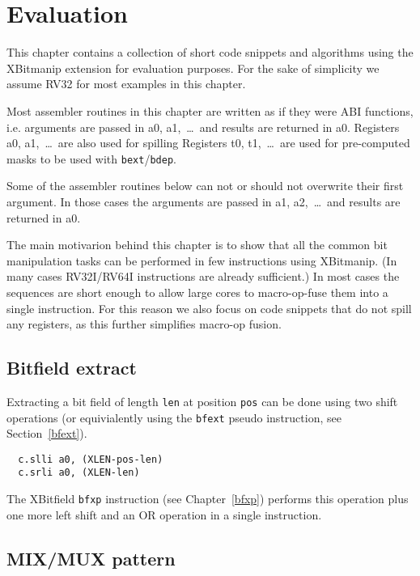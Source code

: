\chapter{Evaluation}

This chapter contains a collection of short code snippets and algorithms using
the XBitmanip extension for evaluation purposes. For the sake of simplicity we
assume RV32 for most examples in this chapter.

Most assembler routines in this chapter are written as if they were ABI functions,
i.e. arguments are passed in a0, a1,~\dots~and results are returned in a0. Registers
a0, a1,~\dots~are also used for spilling Registers t0, t1,~\dots~are used for
pre-computed masks to be used with {\tt bext}/{\tt bdep}.

Some of the assembler routines below can not or should not overwrite their
first argument. In those cases the arguments are passed in a1, a2,~\dots~and
results are returned in a0.

The main motivarion behind this chapter is to show that all the common bit
manipulation tasks can be performed in few instructions using XBitmanip. (In
many cases RV32I/RV64I instructions are already sufficient.) In most cases the
sequences are short enough to allow large cores to macro-op-fuse them into a
single instruction. For this reason we also focus on code snippets that do
not spill any registers, as this further simplifies macro-op fusion.

\section{Bitfield extract}

Extracting a bit field of length {\tt len} at position {\tt pos} can be done using
two shift operations (or equivialently using the {\tt bfext} pseudo instruction, see
Section~\ref{bfext}).

\begin{verbatim}
  c.slli a0, (XLEN-pos-len)
  c.srli a0, (XLEN-len)
\end{verbatim}

The XBitfield {\tt bfxp} instruction (see Chapter~\ref{bfxp}) performs this operation
plus one more left shift and an OR operation in a single instruction.

\section{MIX/MUX pattern}
\label{mixmux}

